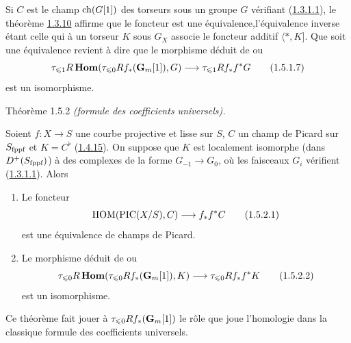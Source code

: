 \documentclass[10pt]{../fichiers-configuration-latex/smfart}
\begin{document}
Si $C$ est le champ $\operatorname{ch}(G[1])$ des torseurs sous un groupe $G$
vérifiant (\hyperref[XVIII.par1.3.1.1]{1.3.1.1}), le théorème \hyperref[XVIII.thm1.3.10]{1.3.10}
affirme que le foncteur 
 est une équivalence,\pageoriginale l'équivalence inverse étant
celle qui à un torseur $K$ sous $G_{X}$ associe le foncteur additif
$\langle \ast,K]$. Que  soit une équivalence revient à dire que le
morphisme déduit de  ou 
\begin{equation*}
\tau_{\leqslant 1}R\operatorname{\mathbf{Hom}}(\tau_{\leqslant
0}Rf_{\ast}(\mathbf{G}_{m}[1]),G)\longrightarrow \tau_{\leqslant 1}
Rf_{\ast}f^{\ast}G\tag{1.5.1.7}
\end{equation*}%
est un isomorphisme.

\begin{enonce*}{Théorème 1.5.2}
\emph{(formule des coefficients universels).}

Soient $f:X\rightarrow S$ une courbe projective et lisse sur $S$, $C$
un champ de Picard sur $S_{\text{\rm fppf}}$ et $K=C^{\flat}$
(\hyperref[XVIII.prop1.4.15]{1.4.15}). On suppose que $K$ est localement isomorphe (dans
$D^{+}(S_{\text{\rm fppf}})$) à des complexes de la forme
$G_{-1}\rightarrow G_{0}$, où les faisceaux $G_{i}$ vérifient
(\hyperref[XVIII.par1.3.1.1]{1.3.1.1}). Alors
\begin{enumerate}
\renewcommand{\theenumi}{\Roman{enumi}}
\renewcommand{\labelenumi}{(\theenumi)}
\item Le foncteur 
\begin{equation*}
\operatorname{HOM}(\operatorname{PIC}(X/S),C)\longrightarrow f_{\ast}f^{\ast}C\tag{1.5.2.1}
\end{equation*}%
est une équivalence de champs de Picard.

\item Le morphisme déduit de  ou 
\begin{equation*}
\tau_{\leqslant 0}R\operatorname{\mathbf{Hom}}(\tau_{\leqslant 0}
Rf_{\ast}(\mathbf{G}_{m}[1]),K)\longrightarrow \tau_{\leqslant 0}
Rf_{\ast}f^{\ast}K\tag{1.5.2.2}
\end{equation*}%
est un isomorphisme.
\end{enumerate}
\end{enonce*}

Ce théorème fait jouer à $\tau_{\leqslant 0}Rf_{\ast}(\mathbf{G}_{m}[1])$
le rôle que joue l'homologie dans la classique formule des
coefficients universels.
\end{document}
